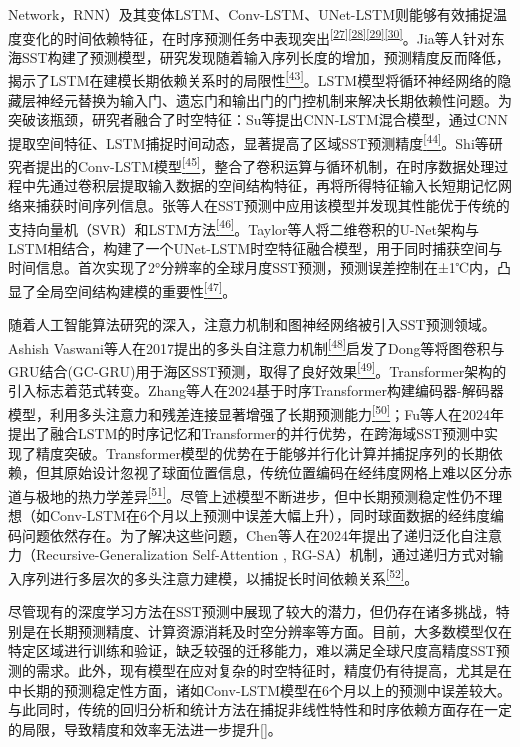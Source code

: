 \documentclass[
  12pt,
]{article}
\begin{document}
Network，RNN）及其变体LSTM、Conv-LSTM、UNet-LSTM则能够有效捕捉温度变化的时间依赖特征，在时序预测任务中表现突出\textsuperscript{\hyperref[_Ref165148613]{{[}27{]}}\hyperref[_Ref165148613]{{[}28{]}}\hyperref[_Ref165148613]{{[}29{]}}\hyperref[_Ref165148613]{{[}30{]}}}。Jia等人针对东海SST构建了预测模型，研究发现随着输入序列长度的增加，预测精度反而降低，揭示了LSTM在建模长期依赖关系时的局限性\hyperref[_Ref165148613]{\textsuperscript{{[}43{]}}}。LSTM模型将循环神经网络的隐藏层神经元替换为输入门、遗忘门和输出门的门控机制来解决长期依赖性问题。为突破该瓶颈，研究者融合了时空特征：Su等提出CNN-LSTM混合模型，通过CNN提取空间特征、LSTM捕捉时间动态，显著提高了区域SST预测精度\hyperref[_Ref165148613]{\textsuperscript{{[}44{]}}}。Shi等研究者提出的Conv-LSTM模型\hyperref[_Ref165148613]{\textsuperscript{{[}45{]}}}，整合了卷积运算与循环机制，在时序数据处理过程中先通过卷积层提取输入数据的空间结构特征，再将所得特征输入长短期记忆网络来捕获时间序列信息。张等人在SST预测中应用该模型并发现其性能优于传统的支持向量机（SVR）和LSTM方法\hyperref[_Ref165148613]{\textsuperscript{{[}46{]}}}。Taylor等人将二维卷积的U-Net架构与LSTM相结合，构建了一个UNet-LSTM时空特征融合模型，用于同时捕获空间与时间信息。首次实现了2°分辨率的全球月度SST预测，预测误差控制在±1℃内，凸显了全局空间结构建模的重要性\hyperref[_Ref165148613]{\textsuperscript{{[}47{]}}}。

随着人工智能算法研究的深入，注意力机制和图神经网络被引入SST预测领域。Ashish
Vaswani等人在2017提出的多头自注意力机制\hyperref[_Ref165148613]{\textsuperscript{{[}48{]}}}启发了Dong等将图卷积与GRU结合(GC-GRU)用于海区SST预测，取得了良好效果\hyperref[_Ref165148613]{\textsuperscript{{[}49{]}}}。Transformer架构的引入标志着范式转变。Zhang等人在2024基于时序Transformer构建编码器-解码器模型，利用多头注意力和残差连接显著增强了长期预测能力\hyperref[_Ref165148613]{\textsuperscript{{[}50{]}}}；Fu等人在2024年提出了融合LSTM的时序记忆和Transformer的并行优势，在跨海域SST预测中实现了精度突破。Transformer模型的优势在于能够并行化计算并捕捉序列的长期依赖，但其原始设计忽视了球面位置信息，传统位置编码在经纬度网格上难以区分赤道与极地的热力学差异\hyperref[_Ref165148613]{\textsuperscript{{[}51{]}}}。尽管上述模型不断进步，但中长期预测稳定性仍不理想（如Conv-LSTM在6个月以上预测中误差大幅上升），同时球面数据的经纬度编码问题依然存在。为了解决这些问题，Chen等人在2024年提出了递归泛化自注意力（Recursive-Generalization
Self-Attention ,
RG-SA）机制，通过递归方式对输入序列进行多层次的多头注意力建模，以捕捉长时间依赖关系\hyperref[_Ref165148613]{\textsuperscript{{[}52{]}}}。

尽管现有的深度学习方法在SST预测中展现了较大的潜力，但仍存在诸多挑战，特别是在长期预测精度、计算资源消耗及时空分辨率等方面。目前，大多数模型仅在特定区域进行训练和验证，缺乏较强的迁移能力，难以满足全球尺度高精度SST预测的需求。此外，现有模型在应对复杂的时空特征时，精度仍有待提高，尤其是在中长期的预测稳定性方面，诸如Conv-LSTM模型在6个月以上的预测中误差较大。与此同时，传统的回归分析和统计方法在捕捉非线性特性和时序依赖方面存在一定的局限，导致精度和效率无法进一步提升{[}{]}。
\end{document}
